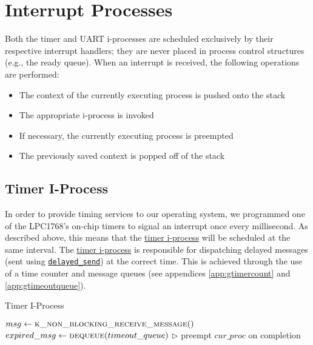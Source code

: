 \documentclass[12pt]{report}
\begin{document}
\section{Interrupt Processes}

Both the timer and UART i-processes are scheduled exclusively by their respective interrupt handlers; they are never placed in process control structures (e.g., the ready queue). When an interrupt is received, the following operations are performed:

\begin{itemize}

\item The context of the currently executing process is pushed onto the stack
\item The appropriate i-process is invoked
\item If necessary, the currently executing process is preempted
\item The previously saved context is popped off of the stack

\end{itemize}

\subsection{Timer I-Process}
\label{subsec:Timer I-Process}

In order to provide timing services to our operating system, we programmed one of the LPC1768's on-chip timers to signal an interrupt once every millisecond. As described above, this means that the \hyperref[alg:timeriprocess]{timer i-process} will be scheduled at the same interval. The \hyperref[alg:timeriprocess]{timer i-process} is responsible for dispatching delayed messages (sent using \hyperref[alg:sendingdelayedmessages]{\texttt{delayed_send}}) at the correct time. This is achieved through the use of a time counter and message queues (see appendices \ref{app:gtimercount} and \ref{app:gtimeoutqueue}).\\

\begin{algorithm}
\caption{Timer I-Process}
\label{alg:timeriprocess}
\begin{algorithmic}[1]
    \State $msg \leftarrow \Call{k\_non\_blocking\_receive\_message}{\null}$
    \State {}
        \State $expired\_msg \leftarrow \Call{dequeue}{timeout\_queue}$
        \State {} 
            \State $\triangleright$ preempt $cur\_proc$ on completion
        \EndIf
    \EndWhile
\EndProcedure
\end{algorithmic}
\end{algorithm}
\end{document}

